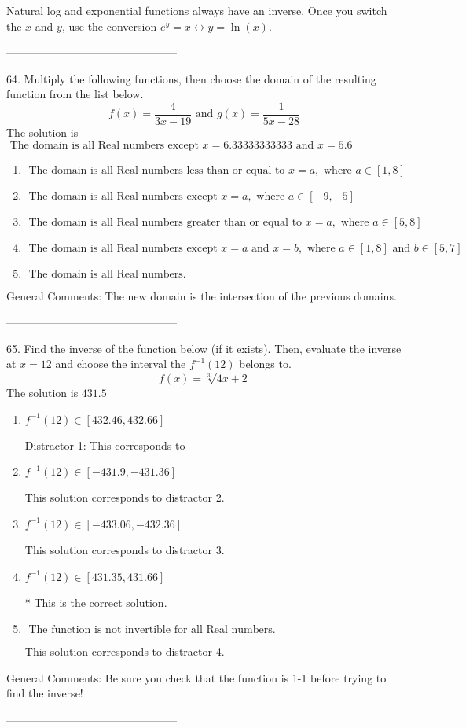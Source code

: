 \documentclass{extbook}[14pt]
\begin{document}
Natural log and exponential functions always have an inverse. Once you switch the $x$ and $y$, use the conversion $ e^y = x \leftrightarrow y=\ln(x)$.

-----------------------------------------------

64. Multiply the following functions, then choose the domain of the resulting function from the list below.
\[ f(x) = \frac{4}{3x-19} \text{ and } g(x) = \frac{1}{5x-28} \] 
The solution is $ \text{ The domain is all Real numbers except } x = 6.33333333333 \text{ and } x = 5.6 $ 

\begin{enumerate}[label=\Alph*.] 
\item $ \text{ The domain is all Real numbers less than or equal to } x = a, \text{ where } a \in [1, 8] $ 

  
\item $ \text{ The domain is all Real numbers except } x = a, \text{ where } a \in [-9, -5] $ 

  
\item $ \text{ The domain is all Real numbers greater than or equal to } x = a, \text{ where } a \in [5, 8] $ 

  
\item $ \text{ The domain is all Real numbers except } x = a \text{ and } x = b, \text{ where } a \in [1, 8] \text{ and } b \in [5, 7] $ 

  
\item $ \text{ The domain is all Real numbers. } $ 

  
\end{enumerate} 
 
General Comments: The new domain is the intersection of the previous domains.

-----------------------------------------------

65. Find the inverse of the function below (if it exists). Then, evaluate the inverse at $x = 12$ and choose the interval the $f^{-1}(12)$ belongs to.
\[ f(x) = \sqrt[3]{4 x + 2} \] 
The solution is $ 431.5 $ 

\begin{enumerate}[label=\Alph*.] 
\item $ f^{-1}(12) \in [432.46, 432.66] $ 

  Distractor 1: This corresponds to  
\item $ f^{-1}(12) \in [-431.9, -431.36] $ 

  This solution corresponds to distractor 2. 
\item $ f^{-1}(12) \in [-433.06, -432.36] $ 

  This solution corresponds to distractor 3. 
\item $ f^{-1}(12) \in [431.35, 431.66] $ 

 * This is the correct solution. 
\item $ \text{ The function is not invertible for all Real numbers. } $ 

  This solution corresponds to distractor 4. 
\end{enumerate} 
 
General Comments: Be sure you check that the function is 1-1 before trying to find the inverse!

-----------------------------------------------
\end{document}
